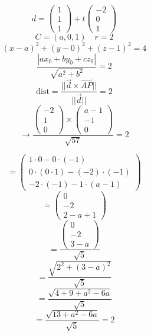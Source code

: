 \documentclass{article}
\begin{document}
\[ d = \begin{pmatrix} 1 \\ 1 \\ 1 \end{pmatrix} + t \begin{pmatrix} -2 \\ 0 \\ 1 \end{pmatrix} \]
\[ C=(a,0,1) \quad r=2 \]
\[ (x-a)^2+(y-0)^2+(z-1)^2=4 \]
\[ \frac{|ax_0+by_0+cz_0|}{\sqrt{a^2+b^2}} = 2 \]
\[ \text{dist} = \frac{||\vec{d} \times \vec{AP}||}{||\vec{d}||} = 2 \]
\[ \rightarrow \frac{\begin{pmatrix} -2 \\ 1 \\ 0 \end{pmatrix} \times \begin{pmatrix} a-1 \\ -1 \\ 0 \end{pmatrix}}{\sqrt{57}} = 2 \]

\[ = \begin{pmatrix} 1 \cdot 0 - 0 \cdot (-1) \\ 0 \cdot(0 \cdot 1) - (-2) \cdot (-1) \\ -2 \cdot (-1)- 1 \cdot (a-1) \end{pmatrix} \]
\[ = \begin{pmatrix} 0 \\ -2 \\ 2-a+1 \end{pmatrix} \]
\[ = \frac{\begin{pmatrix} 0 \\ -2 \\ 3-a \end{pmatrix}}{\sqrt{5}} \]
\[ = \frac{\sqrt{2^2+(3-a)^2}}{\sqrt{5}} \]
\[ = \frac{\sqrt{4+9+a^2-6a}}{\sqrt{5}} \]
\[ = \frac{\sqrt{13+a^2-6a}}{\sqrt{5}} = 2 \]
\end{document}
